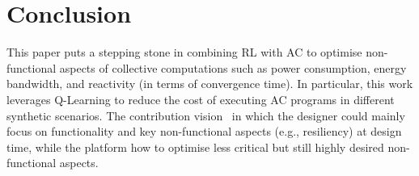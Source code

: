 \section{Conclusion}\label{sec:conclusion}


This paper puts a stepping stone in combining \ac{RL} with \ac{AC} 
 to optimise non-functional aspects of collective computations such as power consumption, 
 energy bandwidth, and reactivity (in terms of convergence time). 
%
In particular, this work leverages Q-Learning 
 to reduce the cost of executing \ac{AC} programs 
 in different synthetic scenarios.
%
The contribution  vision~ in which 
 the designer could mainly focus on functionality and key non-functional aspects (e.g., resiliency)
 at design time, while the platform  how 
 to optimise less critical but still highly desired non-functional aspects. %
